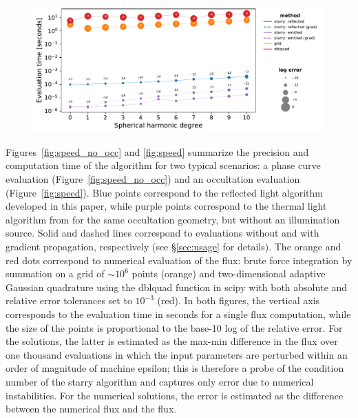 \documentclass[modern]{aastex62}
\begin{document}
\begin{figure}[p!]
    \begin{centering}
        \includegraphics[width=\linewidth]{figures/speed.pdf}
    \end{centering}
\end{figure}

Figures~\ref{fig:speed_no_occ} and \ref{fig:speed} summarize
the precision and computation time of the \starry algorithm for
two typical scenarios: a phase curve evaluation
(Figure~\ref{fig:speed_no_occ}) and an occultation evaluation
(Figure~\ref{fig:speed}).
Blue points correspond to the reflected light algorithm developed
in this paper, while purple points correspond to the thermal light
algorithm from \citet{Luger2019} for the same occultation geometry,
but without an illumination source.
Solid and dashed lines correspond to evaluations without and
with gradient propagation, respectively (see \S\ref{sec:usage}
for details).
The orange and red dots
correspond to numerical evaluation of the flux:
brute force integration by summation on a grid of ${\sim}10^6$ points
(orange) and two-dimensional adaptive Gaussian quadrature using the
\textsf{dblquad} function in \textsf{scipy} \citep{scipy} with
both absolute and relative error tolerances set to $10^{-3}$ (red).
%
In both figures, the vertical axis corresponds to the evaluation
time in seconds for a single flux computation, while the size of the
points is proportional to the base-10 log of the relative error. For the
\starry solutions, the latter is estimated as the max-min difference
in the flux over one thousand evaluations in which the input parameters
are perturbed within an order of magnitude of machine epsilon; this is
therefore a probe of the condition number of the starry algorithm and
captures only error due to numerical instabilities. For the numerical
solutions, the error is estimated as the difference between the numerical
flux and the \starry flux.
\end{document}
